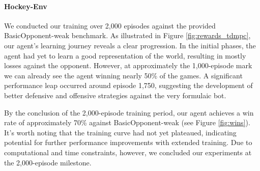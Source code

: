 \paragraph{Hockey-Env}
We conducted our training over 2,000 episodes against the provided BasicOpponent-weak benchmark. 
As illustrated in Figure \ref{fig:rewards_tdmpc}, our agent's learning journey reveals a clear progression. In the initial phases, the agent had yet to learn a good representation of the world, resulting in mostly losses against the opponent. However, at approximately the 1,000-episode mark we can already see the agent winning nearly 50\% of the games. A significant performance leap occurred around episode 1,750, suggesting the development of better defensive and offensive strategies against the very formulaic bot.
\begin{figure}[htbp]
    \centering
    \hspace{0.5cm} %
    \label{fig:sidebyside}
\end{figure}

By the conclusion of the 2,000-episode training period, our agent achieves a win rate of approximately 70\% against BasicOpponent-weak (see Figure \ref{fig:wins}). It's worth noting that the training curve had not yet plateaued, indicating potential for further performance improvements with extended training. Due to computational and time constraints, however, we concluded our experiments at the 2,000-episode milestone.

